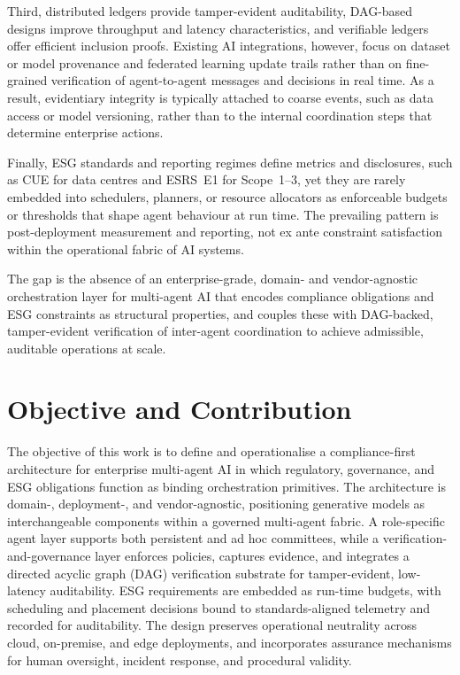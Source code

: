 \documentclass[oneside,10pt]{swissi}
\begin{document}
Third, distributed ledgers provide tamper-evident auditability, DAG-based designs improve throughput and latency characteristics, and verifiable ledgers offer efficient inclusion proofs. Existing AI integrations, however, focus on dataset or model provenance and federated learning update trails rather than on fine-grained verification of agent-to-agent messages and decisions in real time.\cite{silvano2020,baird2016,sompolinsky2021,yue2023,qu2022} As a result, evidentiary integrity is typically attached to coarse events, such as data access or model versioning, rather than to the internal coordination steps that determine enterprise actions.\cite{qu2022,yue2023}

Finally, ESG standards and reporting regimes define metrics and disclosures, such as CUE for data centres and ESRS~E1 for Scope~1–3, yet they are rarely embedded into schedulers, planners, or resource allocators as enforceable budgets or thresholds that shape agent behaviour at run time.\cite{iso30134_8_2022,esrs_e1_2023} The prevailing pattern is post-deployment measurement and reporting, not ex ante constraint satisfaction within the operational fabric of AI systems.\cite{esrs_e1_2023}

The gap is the absence of an enterprise-grade, domain- and vendor-agnostic orchestration layer for multi-agent AI that encodes compliance obligations and ESG constraints as structural properties, and couples these with DAG-backed, tamper-evident verification of inter-agent coordination to achieve admissible, auditable operations at scale.

\section{Objective and Contribution}\label{sec3}

The objective of this work is to define and operationalise a compliance-first architecture for enterprise multi-agent AI in which regulatory, governance, and ESG obligations function as binding orchestration primitives. The architecture is domain-, deployment-, and vendor-agnostic, positioning generative models as interchangeable components within a governed multi-agent fabric. A role-specific agent layer supports both persistent and ad hoc committees, while a verification-and-governance layer enforces policies, captures evidence, and integrates a directed acyclic graph (DAG) verification substrate for tamper-evident, low-latency auditability. ESG requirements are embedded as run-time budgets, with scheduling and placement decisions bound to standards-aligned telemetry and recorded for auditability. The design preserves operational neutrality across cloud, on-premise, and edge deployments, and incorporates assurance mechanisms for human oversight, incident response, and procedural validity.
\end{document}
